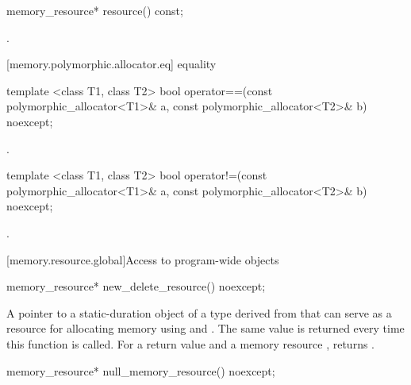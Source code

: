 %
\begin{itemdecl}
memory_resource* resource() const;
\end{itemdecl}

\begin{itemdescr}
\pnum
\returns
{}.
\end{itemdescr}

[memory.polymorphic.allocator.eq]{ equality}

%
\begin{itemdecl}
template <class T1, class T2>
  bool operator==(const polymorphic_allocator<T1>& a,
                  const polymorphic_allocator<T2>& b) noexcept;
\end{itemdecl}

\begin{itemdescr}
\pnum
\returns
{}.
\end{itemdescr}

%
\begin{itemdecl}
template <class T1, class T2>
  bool operator!=(const polymorphic_allocator<T1>& a,
                  const polymorphic_allocator<T2>& b) noexcept;
\end{itemdecl}

\begin{itemdescr}
\pnum
\returns
{}.
\end{itemdescr}


[memory.resource.global]{Access to program-wide  objects}

%
\begin{itemdecl}
memory_resource* new_delete_resource() noexcept;
\end{itemdecl}

\begin{itemdescr}
\pnum
\returns
A pointer to a static-duration object of a type derived from 
that can serve as a resource for allocating memory
using  and .
The same value is returned every time this function is called.
For a return value  and a memory resource ,
 returns .
\end{itemdescr}

%
\begin{itemdecl}
memory_resource* null_memory_resource() noexcept;
\end{itemdecl}

